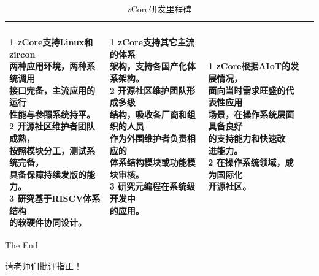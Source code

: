 \documentclass[
8pt, %
]{beamer}
\begin{document}
\begin{frame}
\begin{table}
{\begin{tabular}{l l l l}
				\makecell[l]{\\1 zCore支持Linux和zircon\\两种应用环境，两种系统调用\\接口完备，主流应用的运行\\性能与参照系统持平。\\
							 2 开源社区维护者团队成熟，\\按照模块分工，测试系统完备，\\具备保障持续发版的能力。\\
							 3 研究基于RISCV体系结构\\的软硬件协同设计。} &
				\makecell[l]{1 zCore支持其它主流的体系\\架构，支持各国产化体系架构。\\
							 2 开源社区维护团队形成多级\\结构，吸收各厂商和组织的人员\\作为外围维护者负责相应的\\体系结构模块或功能模块审核。\\
							 3 研究元编程在系统级开发中\\的应用。} &
				\makecell[l]{1 zCore根据AIoT的发展情况，\\面向当时需求旺盛的代表性应用\\场景，在操作系统层面具备良好\\的支持能力和快速改\\进能力。\\
							 2 在操作系统领域，成为国际化\\开源社区。} \\
				\bottomrule
			\end{tabular}
			}
			\caption{zCore研发里程碑}
		\end{table}
	\end{frame}

	\begin{frame}[plain]
		\begin{center}
			{\Huge The End}

			\bigskip\bigskip %

			{\LARGE 请老师们批评指正！}
		\end{center}
	\end{frame}
\end{document}
